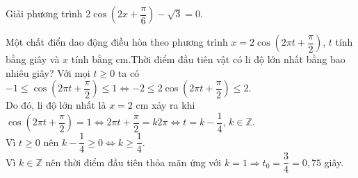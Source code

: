 
\TL

\begin{ex}%
	Giải phương trình $2 \cos \left(2 x+\dfrac{\pi}{6}\right)-\sqrt{3}=0$.
\end{ex}

\begin{ex}%
	Một chất điển dao động điều hòa theo phương trình $x= 2 \cos \left( 2\pi t + \dfrac{\pi}{2} \right)$, $t$ tính bằng giây và $x$ tính bằng cm.Thời điểm đầu tiên vật có li độ lớn nhất bằng bao nhiêu giây?
	\loigiai
	{
	Với mọi $t \ge 0$ ta có $-1 \le \cos \left( 2\pi t + \dfrac{\pi}{2} \right) \le 1 \Leftrightarrow -2 \le 2 \cos \left( 2\pi t + \dfrac{\pi}{2} \right) \le 2$.\\
	Do đó, li độ lớn nhất là $x=2$ cm xảy ra khi \\
	$ \cos \left( 2\pi t + \dfrac{\pi}{2} \right) =1 \Leftrightarrow 2\pi t + \dfrac{\pi}{2} = k2\pi \Leftrightarrow t = k - \dfrac{1}{4}$, $k \in \mathbb{Z}$.\\
	Vì $t \ge 0$ nên $k- \dfrac{1}{4} \ge 0 \Leftrightarrow k \ge \dfrac{1}{4}$.\\
	Vì $k \in \mathbb{Z}$ nên thời điểm đầu tiên thỏa mãn ứng với $k=1 \Rightarrow t_0 = \dfrac{3}{4} = 0{,}75$ giây.
	}
\end{ex}

